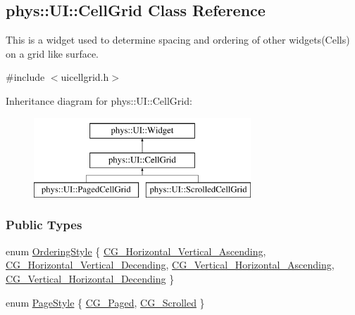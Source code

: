 \hypertarget{classphys_1_1UI_1_1CellGrid}{
\subsection{phys::UI::CellGrid Class Reference}
\label{classphys_1_1UI_1_1CellGrid}
}


This is a widget used to determine spacing and ordering of other widgets(Cells) on a grid like surface.  




{\ttfamily \#include $<$uicellgrid.h$>$}

Inheritance diagram for phys::UI::CellGrid:\begin{figure}[H]
\begin{center}
\leavevmode
\includegraphics[height=3.000000cm]{classphys_1_1UI_1_1CellGrid}
\end{center}
\end{figure}
\subsubsection*{Public Types}
\begin{DoxyCompactItemize}
\item 
enum \hyperlink{classphys_1_1UI_1_1CellGrid_a4b77ef63082513fc9f845537d104496b}{OrderingStyle} \{ \hyperlink{classphys_1_1UI_1_1CellGrid_a4b77ef63082513fc9f845537d104496ba40efb4a2512c8f3129eaf967522c9b30}{CG\_\-Horizontal\_\-Vertical\_\-Ascending}, 
\hyperlink{classphys_1_1UI_1_1CellGrid_a4b77ef63082513fc9f845537d104496badecf0f97dbc2c5f4df2ac84b1c063de6}{CG\_\-Horizontal\_\-Vertical\_\-Decending}, 
\hyperlink{classphys_1_1UI_1_1CellGrid_a4b77ef63082513fc9f845537d104496ba6114116f4ee36620ca28d2ca052d6839}{CG\_\-Vertical\_\-Horizontal\_\-Ascending}, 
\hyperlink{classphys_1_1UI_1_1CellGrid_a4b77ef63082513fc9f845537d104496bab220567598ddaadfe133b9fef6f14b43}{CG\_\-Vertical\_\-Horizontal\_\-Decending}
 \}
\item 
enum \hyperlink{classphys_1_1UI_1_1CellGrid_a3644cef16e10c867c233105aae7b4e75}{PageStyle} \{ \hyperlink{classphys_1_1UI_1_1CellGrid_a3644cef16e10c867c233105aae7b4e75a5cc13206330cf9ed55fb443ff4600c77}{CG\_\-Paged}, 
\hyperlink{classphys_1_1UI_1_1CellGrid_a3644cef16e10c867c233105aae7b4e75add8259b571786b4e1976dcdb97a8e9c6}{CG\_\-Scrolled}
 \}
\end{DoxyCompactItemize}
